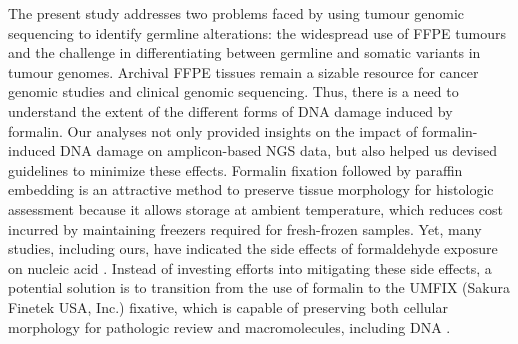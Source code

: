 The present study addresses two problems faced by using tumour genomic sequencing to identify germline alterations: the widespread use of FFPE tumours and the challenge in differentiating between germline and somatic variants in tumour genomes. Archival FFPE tissues remain a sizable resource for cancer genomic studies and clinical genomic sequencing. Thus, there is a need to understand the extent of the different forms of DNA damage induced by formalin. Our analyses not only provided insights on the impact of formalin-induced DNA damage on amplicon-based NGS data, but also helped us devised guidelines to minimize these effects. Formalin fixation followed by paraffin embedding is an attractive method to preserve tissue morphology for histologic assessment because it allows storage at ambient temperature, which reduces cost incurred by maintaining freezers required for fresh-frozen samples. Yet, many studies, including ours, have indicated the side effects of formaldehyde exposure on nucleic acid \cite{Do2015a, Kim2017, Ofner2017, Oh2015, Wong2013, Wong2014, Sikorsky2007}. Instead of investing efforts into mitigating these side effects, a potential solution is to transition from the use of formalin to the UMFIX (Sakura Finetek USA, Inc.) fixative, which is capable of preserving both cellular morphology for pathologic review and macromolecules, including DNA \cite{Vincek2003}.

